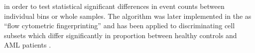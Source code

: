 in order to test statistical significant differences in event counts between individual bins or whole samples.
The algorithm was later implemented in the  as ``flow cytometric fingerprinting'' and has been
applied to discriminating cell subsets which differ significantly in proportion between healthy controls and \gls{AML} patients
\citep{Rogers:2008ij,Rogers:2009jz}.


